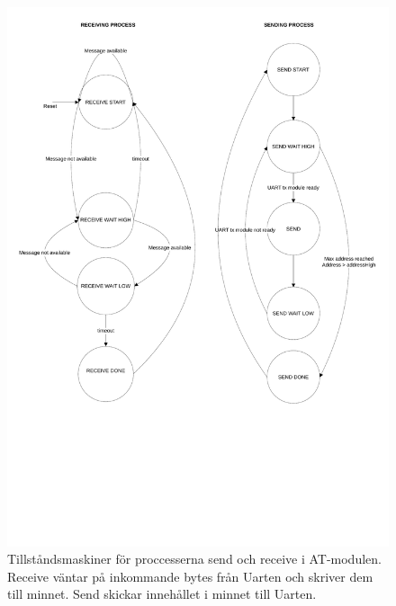 \documentclass[a4paper]{scrartcl}
\begin{document}
		\begin{figure}[H]
			\centering
			\includegraphics[scale=0.4]{atprocessess.pdf}
			\caption{Tillståndsmaskiner för proccesserna send och receive i AT-modulen. Receive väntar på inkommande bytes från Uarten och skriver dem till minnet. Send skickar innehållet i minnet till Uarten.}
		\end{figure}
		

	
\end{document}
